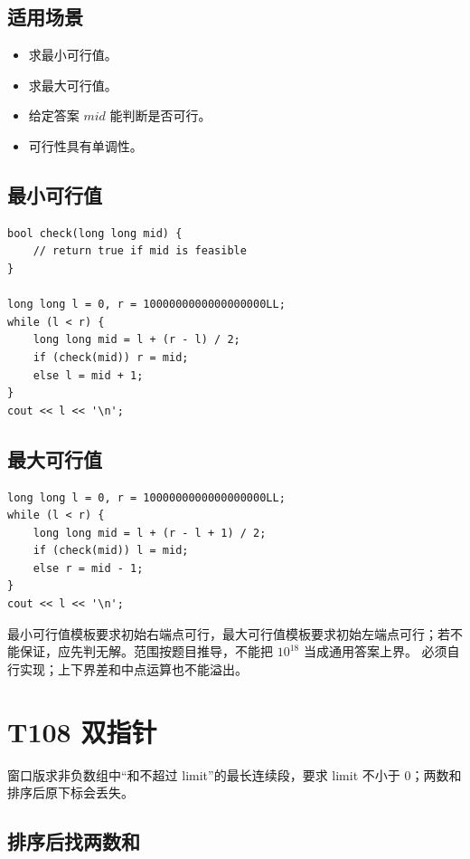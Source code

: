 \subsection{适用场景}

\begin{itemize}
  \item 求最小可行值。
  \item 求最大可行值。
  \item 给定答案 $mid$ 能判断是否可行。
  \item 可行性具有单调性。
\end{itemize}

\subsection{最小可行值}

\begin{lstlisting}
bool check(long long mid) {
    // return true if mid is feasible
}

long long l = 0, r = 1000000000000000000LL;
while (l < r) {
    long long mid = l + (r - l) / 2;
    if (check(mid)) r = mid;
    else l = mid + 1;
}
cout << l << '\n';
\end{lstlisting}

\subsection{最大可行值}

\begin{lstlisting}
long long l = 0, r = 1000000000000000000LL;
while (l < r) {
    long long mid = l + (r - l + 1) / 2;
    if (check(mid)) l = mid;
    else r = mid - 1;
}
cout << l << '\n';
\end{lstlisting}

最小可行值模板要求初始右端点可行，最大可行值模板要求初始左端点可行；若不能保证，应先判无解。范围按题目推导，不能把 $10^{18}$ 当成通用答案上界。 必须自行实现；上下界差和中点运算也不能溢出。

\section{T108 双指针}\label{sec:09-10}\label{tpl:108}

窗口版求非负数组中“和不超过 limit”的最长连续段，要求 limit 不小于 0；两数和排序后原下标会丢失。

\subsection{排序后找两数和}

